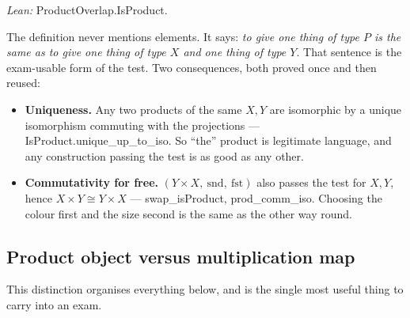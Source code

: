 \documentclass[11pt,a4paper]{article}
\theoremstyle{definition}
\newcommand{\lean}[1]{\textsf{\small #1}}
\begin{document}
\noindent\emph{Lean:} \lean{ProductOverlap.IsProduct}.

The definition never mentions elements.  It says: \emph{to give one thing of type $P$ is
the same as to give one thing of type $X$ and one thing of type $Y$}.  That sentence is the
exam-usable form of the test.  Two consequences, both proved once and then reused:

\begin{itemize}[nosep]
\item \textbf{Uniqueness.}  Any two products of the same $X,Y$ are isomorphic by a unique
      isomorphism commuting with the projections --- \lean{IsProduct.unique\_up\_to\_iso}.
      So ``the'' product is legitimate language, and any construction passing the test is
      as good as any other.
\item \textbf{Commutativity for free.}  $(Y\times X,\ \mathrm{snd},\ \mathrm{fst})$ also
      passes the test for $X,Y$, hence $X\times Y\cong Y\times X$ --- \lean{swap\_isProduct},
      \lean{prod\_comm\_iso}.  Choosing the colour first and the size second is the same
      as the other way round.
\end{itemize}

\subsection*{Product object versus multiplication map}

This distinction organises everything below, and is the single most useful thing to carry
into an exam.

\begin{center}
\end{center}
\end{document}
